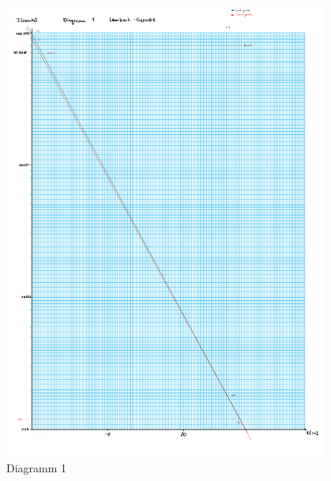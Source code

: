 \begin{figure}[h!]
    \centering
    \includegraphics[page=1, width=0.95\textwidth,]{Versuch34Dias.pdf}
    \caption{Diagramm 1}
\end{figure}
\newpage
